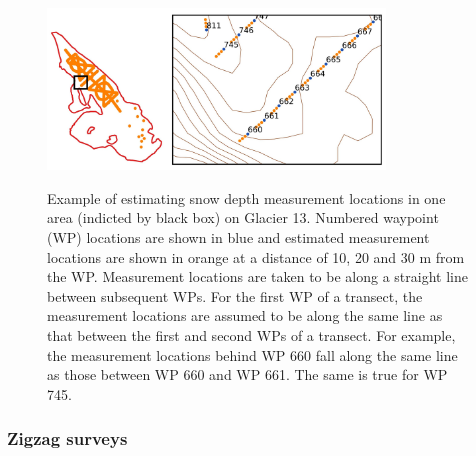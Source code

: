 \documentclass{sfuthesis}
\begin{document}
\begin{figure}[H]
	\centering
	\includegraphics[width = 0.8\textwidth]{transect_measure_locations.jpeg}\\
	\caption[Example of estimating snow depth measurement locations in one area on Glacier 13]{Example of estimating snow depth measurement locations in one area (indicted by black box) on Glacier 13. Numbered waypoint (WP) locations are shown in blue and estimated measurement locations are shown in orange at a distance of 10, 20 and 30 m from the WP. Measurement locations are taken to be along a straight line between subsequent WPs. For the first WP of a transect, the measurement locations are assumed to be along the same line as that between the first and second WPs of a transect. For example, the measurement locations behind WP 660 fall along the same line as those between WP 660 and WP 661. The same is true for WP 745. }
	\label{fig:transect_measure_loc}
\end{figure}

\subsubsection{Zigzag surveys}
\end{document}
